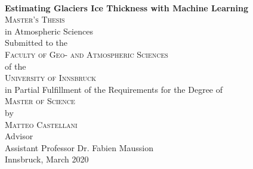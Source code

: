 \begin{titlepage}
\begin{center}

~\\[15mm]
{\Huge  {\bf Estimating Glaciers Ice Thickness with Machine Learning}}\\[5mm]




{\Large \textsc{Master's Thesis}} \\[15mm]


{\large in Atmospheric Sciences} \\[15mm]


{\large Submitted to the} \\[2mm]
{\Large \textsc{Faculty of Geo- and Atmospheric Sciences}} \\[2mm]
{\large of the} \\[2mm]
{\Large \textsc{University of Innsbruck}} \\[15mm]


{\large in Partial Fulfillment of the Requirements for the Degree of} \\[2mm]
{\Large \textsc{Master of Science}} \\[15mm]


{\large by} \\[2mm]
{\Large \textsc{Matteo Castellani}} \\[15mm]


{\large Advisor} \\[2mm]
{\large Assistant Professor Dr. Fabien Maussion} \\[15mm]


{\large Innsbruck, March 2020}


\end{center}
\end{titlepage}
